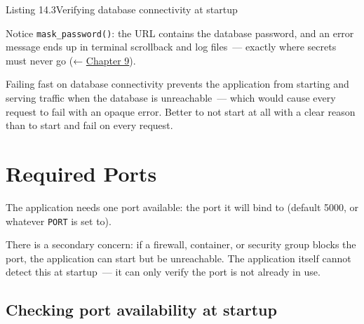 \begin{codeboxcap}{\textcolor{accent}{Listing 14.3}\enspace Verifying database connectivity at startup}
\begin{Shaded}
\begin{Highlighting}[]
\NormalTok{) }\OperatorTok{{-}\textgreater{}} \NormalTok{:}
\OperatorTok{=}
        \SpecialCharTok{\{}\SpecialCharTok{\}}\NormalTok{, }\NormalTok{, }\NormalTok{)}
\end{Highlighting}
\end{Shaded}

\end{codeboxcap}

\noindent{}Notice \texttt{mask\_password()}: the URL contains the database password, and an error message ends up in terminal scrollback and log files~--- exactly where secrets must never go (← \hyperref[ch:09-configuration-coupling]{Chapter 9}).

Failing fast on database connectivity prevents the application from starting and serving traffic when the database is unreachable~--- which would cause every request to fail with an opaque error. Better to not start at all with a clear reason than to start and fail on every request.

\setcounter{section}{2}
\section{Required Ports}\label{14-runtime-contract:143-required-ports}

The application needs one port available: the port it will bind to (default 5000, or whatever \texttt{PORT} is set to).

There is a secondary concern: if a firewall, container, or security group blocks the port, the application can start but be unreachable. The application itself cannot detect this at startup~--- it can only verify the port is not already in use.

\subsection*{Checking port availability at startup}\label{14-runtime-contract:checking-port-availability-at-startup}

